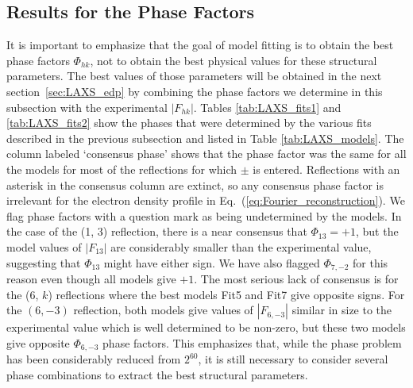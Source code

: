 \subsection{Results for the Phase Factors}\label{sec:LAXS_phases_results}
It is important to emphasize that the goal of model fitting is to obtain the 
best phase factors $\Phi_{hk}$, not to obtain the best physical values for these 
structural parameters.  The best values of those parameters will be obtained 
in the next section~\ref{sec:LAXS_edp} by combining the phase factors we 
determine in this subsection with the experimental $|F_{hk}|$.  
Tables \ref{tab:LAXS_fits1} and \ref{tab:LAXS_fits2} show the phases that 
were determined by the various fits described in the previous subsection and 
listed in Table \ref{tab:LAXS_models}. The column labeled `consensus phase'
shows that the phase factor was the same for all the models for most of the 
reflections for which $\pm$ is entered.  Reflections with an asterisk in the 
consensus column are extinct, so any consensus phase factor is irrelevant for 
the electron density profile in Eq.~(\ref{eq:Fourier_reconstruction}). 
We flag phase factors with a question 
mark as being undetermined by the models.  In the case of the (1, 3) reflection, 
there is a near consensus that $\Phi_{13}=+1$, but the model values of 
$|F_{13}|$ are considerably smaller than the experimental value, suggesting 
that $\Phi_{13}$ might have either sign.  We have also flagged $\Phi_{7,-2}$ 
for this reason even though all models give $+1$. The most serious lack of 
consensus is for the (6, $k$) reflections where the best models Fit5 and Fit7 
give opposite signs. For the $(6,-3)$ reflection, both models give values of 
$|F_{6,-3}|$ similar in size to the experimental value which is well 
determined to be non-zero, but these two models give opposite $\Phi_{6,-3}$ 
phase factors.  This emphasizes that, while the phase problem has been 
considerably reduced from $2^{60}$, it is still necessary to consider several 
phase combinations to extract the best structural parameters.
